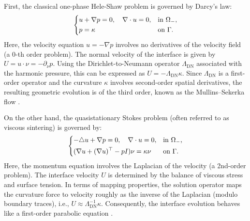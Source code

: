 \documentclass{article}
\theoremstyle{remark}
\theoremstyle{definition}
\numberwithin{equation}{section}
\begin{document}
First, the classical one-phase Hele-Shaw problem is governed by Darcy's law:
\begin{equation*}
    \begin{dcases*}
        u + \nabla p = 0,\quad \nabla\cdot u = 0,&in $\Omega_-$,\\
        p = \kappa&on $\Gamma$.
    \end{dcases*}
\end{equation*}
Here, the velocity equation $u = -\nabla p$ involves no derivatives of the velocity field (a 0-th order problem). The normal velocity of the interface is given by $U = u \cdot \nu = -\partial_\nu p$. Using the Dirichlet-to-Neumann operator $\Lambda_{\mathrm{DN}}$ associated with the harmonic pressure, this can be expressed as $U = -\Lambda_{\mathrm{DN}} \kappa$. Since $\Lambda_{\mathrm{DN}}$ is a first-order operator and the curvature $\kappa$ involves second-order spatial derivatives, the resulting geometric evolution is of the third order, known as the Mullins--Sekerka flow \cite{chen1993hele, constantin1993global, escher1997classical}.

On the other hand, the quasistationary Stokes problem (often referred to as viscous sintering) is governed by:
\begin{equation*}
    \begin{dcases*}
        -\triangle u + \nabla p = 0, \quad \nabla \cdot u = 0,&in $\Omega_-$,\\
        (\nabla u + (\nabla u)^\top - pI)\nu = \kappa\nu&on $\Gamma$.
    \end{dcases*}
\end{equation*}
Here, the momentum equation involves the Laplacian of the velocity (a 2nd-order problem). The interface velocity $U$ is determined by the balance of viscous stress and surface tension. In terms of mapping properties, the solution operator maps the curvature force to velocity roughly as the inverse of the Laplacian (modulo boundary traces), i.e., $U \approx \Lambda_{\mathrm{DN}}^{-1} \kappa$. Consequently, the interface evolution behaves like a first-order parabolic equation \cite{hopper1990plane, prokert1995existence}.
\end{document}
